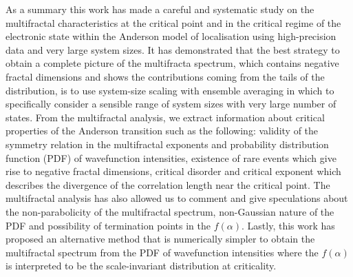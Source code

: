 As a summary this work has made a careful and systematic study on the multifractal characteristics at the critical point and in the critical regime of the electronic state within the Anderson model of localisation using high-precision data and very large system sizes.  It has demonstrated that the best strategy to obtain a complete picture of the multifracta spectrum, which contains negative fractal dimensions and shows the contributions coming from the tails of the distribution, is to use system-size scaling with ensemble averaging in which to specifically consider a sensible range of system sizes with very large number of states.
From the multifractal analysis, we extract information about critical properties of the Anderson transition such as the following: validity of the symmetry relation in the multifractal exponents and probability distribution function (PDF) of wavefunction intensities, existence of rare events which give rise to negative fractal dimensions, critical disorder and critical exponent which describes the divergence of the correlation length near the critical point.  The multifractal analysis has also allowed us to comment and give speculations about the non-parabolicity of the multifractal spectrum, non-Gaussian nature of the PDF and possibility of termination points in the $f(\alpha)$.  Lastly, this work has proposed an alternative method that is numerically simpler to obtain the multifractal spectrum from the PDF of wavefunction intensities where the $f(\alpha)$ is interpreted to be the scale-invariant distribution at criticality.